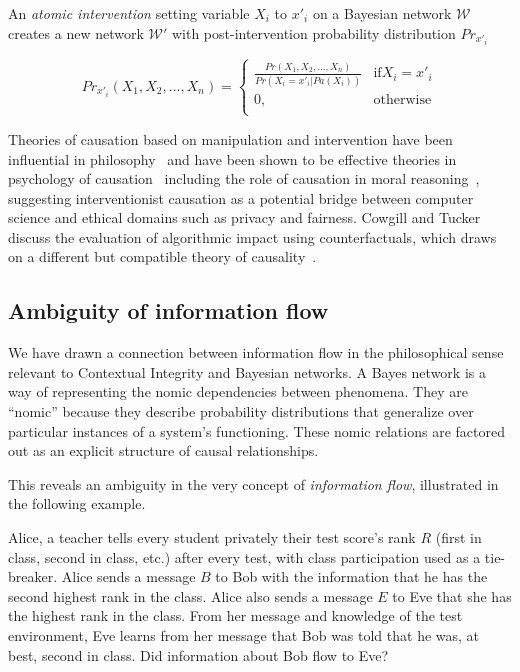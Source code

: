 \documentclass[../thesis.tex]{subfiles}
\newcommand{\W}{\mathcal{W}} %
\begin{document}
\begin{dfn}[Intervention]
  An \emph{atomic intervention} setting variable
  $X_i$ to $x'_i$ on a Bayesian network $\W$ creates a new
  network $\W'$ with post-intervention probability
  distribution $Pr_{x'_i}$

  $$Pr_{x'_i}(X_1,X_2,...,X_n) = \begin{cases}
               \frac{Pr(X_1,X_2,...,X_n)}{Pr(X_i = x'_i \vert Pa(X_i))} & \text{if} X_i = x'_i \\
               0, & \text{otherwise}\\
  \end{cases}$$
\end{dfn}

Theories of causation based on manipulation and intervention
have been influential in philosophy~\cite{woodward2005making}
and have been shown to be effective theories in
psychology of causation~\cite{sloman2005causal}
including the role of causation in moral 
reasoning~\cite{sloman2009causal}, suggesting interventionist
causation as a potential bridge between computer science
and ethical domains such as privacy and fairness.
Cowgill and Tucker~\cite{cowgillalgorithmic} 
discuss the evaluation
of algorithmic impact using counterfactuals, which
draws on a different but compatible theory of
causality~\cite{rubin1974estimating}.

\subsection{Ambiguity of information flow}
\label{sec:ambiguity}

We have drawn a connection
between information flow in the philosophical sense
relevant to Contextual Integrity and Bayesian networks.
A Bayes network is a way of representing the nomic dependencies
between phenomena.
They are ``nomic'' because they describe probability 
distributions that generalize over particular instances of a 
system's functioning. These nomic relations
are factored out as an explicit structure of causal relationships.

This reveals an ambiguity in the very concept of \emph{information flow},
illustrated in the following example.

\begin{exm}
Alice, a teacher tells every student
privately their test score's rank $R$ (first in class,
second in class, etc.) after every test, with class
participation used as a tie-breaker.
Alice sends a message $B$ to Bob with the information that
he has the second highest rank in the class.
Alice also sends a message $E$ to Eve that she has
the highest rank in the class.
From her message and knowledge of the test environment,
Eve learns from her message that Bob was told that he
was, at best, second in class.
Did information about Bob flow to Eve?
\end{exm}
\end{document}
